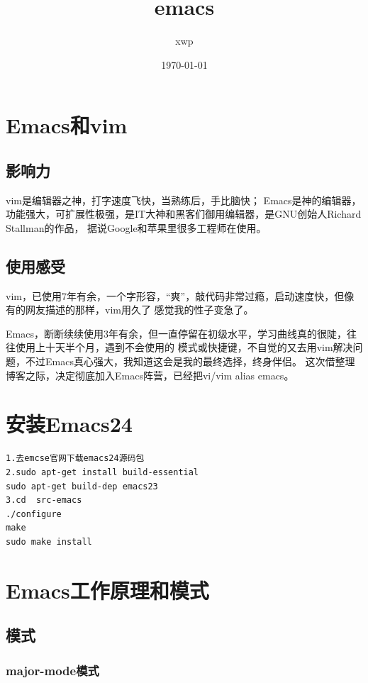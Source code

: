 \documentclass[11pt]{article}
\title{emacs}
\author{xwp}
\date{\today}
\begin{document}
\maketitle

\setcounter{tocdepth}{3}
\tableofcontents
\vspace*{1cm}
\section{Emacs和vim}
\label{sec-1}
\subsection{影响力}
\label{sec-1-1}

   vim是编辑器之神，打字速度飞快，当熟练后，手比脑快；
   Emacs是神的编辑器，功能强大，可扩展性极强，是IT大神和黑客们御用编辑器，是GNU创始人Richard Stallman的作品，
   据说Google和苹果里很多工程师在使用。
\subsection{使用感受}
\label{sec-1-2}

   vim，已使用7年有余，一个字形容，“爽”，敲代码非常过瘾，启动速度快，但像有的网友描述的那样，vim用久了
   感觉我的性子变急了。

   Emacs，断断续续使用3年有余，但一直停留在初级水平，学习曲线真的很陡，往往使用上十天半个月，遇到不会使用的
   模式或快捷键，不自觉的又去用vim解决问题，不过Emacs真心强大，我知道这会是我的最终选择，终身伴侣。
   这次借整理博客之际，决定彻底加入Emacs阵营，已经把vi/vim alias emacs。
\section{安装Emacs24}
\label{sec-2}


\begin{verbatim}
1.去emcse官网下载emacs24源码包
2.sudo apt-get install build-essential
sudo apt-get build-dep emacs23
3.cd  src-emacs
./configure
make
sudo make install
\end{verbatim}
\section{Emacs工作原理和模式}
\label{sec-3}
\subsection{模式}
\label{sec-3-1}
\subsubsection{major-mode模式}
\label{sec-3-1-1}
\end{document}
